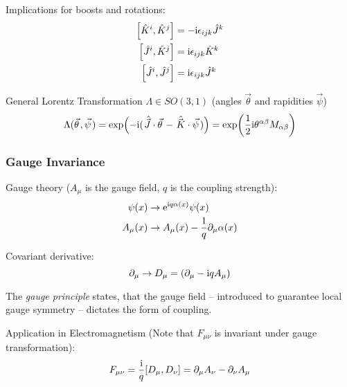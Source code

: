 			\noindent
			Implications for boosts and rotations:
			\begin{equation}
				\begin{aligned}
					\comm{\hat{K}^i}{\hat{K}^j} &= -\i \levicivita_{ijk}\hat{J}^k \\
					\comm{\hat{J}^i}{\hat{K}^j} &= \i \levicivita_{ijk}\hat{K}^k \\
					\comm{\hat{J}^i}{\hat{J}^j} &= \i \levicivita_{ijk}\hat{J}^k \\
				\end{aligned}
			\end{equation}

			\noindent
			General Lorentz Transformation $\Lambda\in SO(3,1)$ (angles $\vec{\theta}$ and rapidities $\vec{\psi}$)
			\begin{equation}
				\label{Eq:GeneralLorentzTransformation}
				\Lambda(\vec{\theta}, \vec{\psi})
				= \exp(-\i(\hat{\vec{J}}\cdot\vec{\theta} - \hat{\vec{K}}\cdot\vec{\psi}))
				= \exp(\frac{1}{2}\i \theta^{\alpha\beta} M_{\alpha\beta})
			\end{equation}

		\subsubsection{Gauge Invariance}
			Gauge theory ($A_\mu$ is the gauge field, $q$ is the coupling strength):
			\begin{equation}
				\begin{aligned}
					\psi(x) &\to \mathrm{e}^{\mathrm{i} q \alpha(x)}\psi(x) \\
					A_\mu(x) &\to A_\mu(x) - \frac{1}{q}\partial_\mu\alpha(x) \\
				\end{aligned}
			\end{equation}

			\noindent
			Covariant derivative:
			\begin{equation}
				\partial_\mu \to D_\mu = \qty(\partial_\mu - \mathrm{i} q A_\mu) \\
			\end{equation}

			\noindent
			The \emph{gauge principle} states, that the gauge field -- introduced to guarantee local gauge symmetry -- dictates the form of coupling.

			\noindent
			Application in Electromagnetism (Note that $F_{\mu\nu}$ is invariant under gauge transformation):
			\begin{equation}
				F_{\mu\nu} =  \frac{\i}{q} \comm{D_\mu}{D_\nu} = \partial_\mu A_\nu - \partial_\nu A_\mu
			\end{equation}


